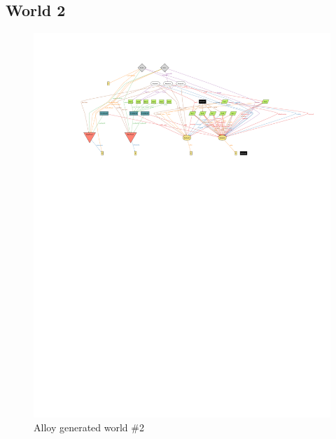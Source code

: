 \subsection{World 2}
\begin{figure}[H]
\centering
\includegraphics[width=\textheight,keepaspectratio, angle=90]{../images/alloy/world2.pdf}
\caption{Alloy generated world \#2}
\end{figure}